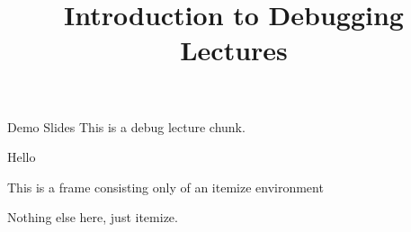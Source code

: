 \documentclass[11pt,compress,t,notes=noshow, xcolor=table]{beamer}
\title{Introduction to Debugging Lectures}
\begin{document}

\begin{frame}{Demo Slides}
  \vfill
  This is a debug lecture chunk.
  \vfill
\end{frame}


\begin{framei}{Hello}
  \item This is a frame consisting only of an itemize environment
  \item Nothing else here, just itemize.
\end{framei}

\endlecture
\end{document}
